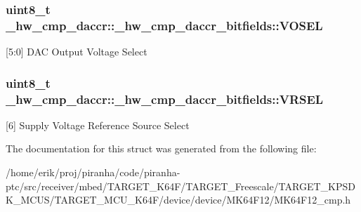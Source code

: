 \subsubsection[{\texorpdfstring{V\+O\+S\+EL}{VOSEL}}]{\setlength{\rightskip}{0pt plus 5cm}uint8\+\_\+t \+\_\+hw\+\_\+cmp\+\_\+daccr\+::\+\_\+hw\+\_\+cmp\+\_\+daccr\+\_\+bitfields\+::\+V\+O\+S\+EL}\hypertarget{struct__hw__cmp__daccr_1_1__hw__cmp__daccr__bitfields_a013e05c90d2126da62c8a3d1b87dc918}{}\label{struct__hw__cmp__daccr_1_1__hw__cmp__daccr__bitfields_a013e05c90d2126da62c8a3d1b87dc918}
\mbox{[}5\+:0\mbox{]} D\+AC Output Voltage Select 
\subsubsection[{\texorpdfstring{V\+R\+S\+EL}{VRSEL}}]{\setlength{\rightskip}{0pt plus 5cm}uint8\+\_\+t \+\_\+hw\+\_\+cmp\+\_\+daccr\+::\+\_\+hw\+\_\+cmp\+\_\+daccr\+\_\+bitfields\+::\+V\+R\+S\+EL}\hypertarget{struct__hw__cmp__daccr_1_1__hw__cmp__daccr__bitfields_af52c1d21824bf8dfa477140189968bde}{}\label{struct__hw__cmp__daccr_1_1__hw__cmp__daccr__bitfields_af52c1d21824bf8dfa477140189968bde}
\mbox{[}6\mbox{]} Supply Voltage Reference Source Select 

The documentation for this struct was generated from the following file\+:\begin{DoxyCompactItemize}
\item 
/home/erik/proj/piranha/code/piranha-\/ptc/src/receiver/mbed/\+T\+A\+R\+G\+E\+T\+\_\+\+K64\+F/\+T\+A\+R\+G\+E\+T\+\_\+\+Freescale/\+T\+A\+R\+G\+E\+T\+\_\+\+K\+P\+S\+D\+K\+\_\+\+M\+C\+U\+S/\+T\+A\+R\+G\+E\+T\+\_\+\+M\+C\+U\+\_\+\+K64\+F/device/device/\+M\+K64\+F12/M\+K64\+F12\+\_\+cmp.\+h\end{DoxyCompactItemize}
